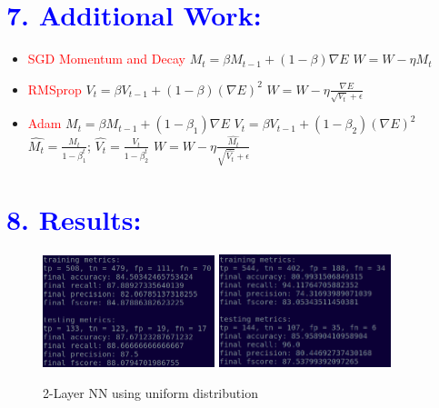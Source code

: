 \documentclass[a4paper,10pt,twocolumn]{article}
\begin{document}
\section*{\textcolor{blue}{7. Additional Work:}}
\begin{itemize}
\item{\textcolor{red}{SGD Momentum and Decay}
\newline				
$M_t = \beta M_{t-1} + (1 - \beta)\nabla E$
\newline
$W = W - \eta M_t$
}
\item{\textcolor{red}{RMSprop}
\newline
$V_t = \beta V_{t-1} + (1 - \beta)(\nabla E)^2$
\newline
$W = W - \eta \frac{\nabla E}{\sqrt{V_t} + \epsilon}$
}
\item{\textcolor{red}{Adam}
\newline
$M_t = \beta M_{t-1} + (1 - \beta_1)\nabla E$
\newline
$V_t = \beta V_{t-1} + (1 - \beta_2)(\nabla E)^2$
\newline
$\hat{M_t} = \frac{M_t}{1 - \beta_1^t}$; $\hat{V_t} = \frac{V_t}{1 - \beta_2^t}$
\newline
$W = W - \eta \frac{\hat{M_t}}{\sqrt{\hat{V_t}} + \epsilon}$
}
\end{itemize}


\newpage
\onecolumn
\section*{\textcolor{blue}{8. Results:}}
\begin{figure}[h!]
\centering
\includegraphics[scale=1.0, width=5cm]{Fig1.png}
\includegraphics[scale=1.0, width=5cm]{Fig2.png}
\caption*{2-Layer NN using uniform distribution}
\end{figure}
\end{document}
